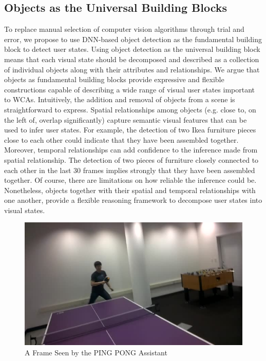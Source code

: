 \subsection{Objects as the Universal Building Blocks}

To replace manual selection of computer vision algorithms through trial and
error, we propose to use DNN-based object detection as the fundamental building
block to detect user states. Using object detection as the universal building
block means that each visual state should be decomposed and described as a
collection of individual objects along with their attributes and relationships.
We argue that objects as fundamental building blocks provide expressive and
flexible constructions capable of describing a wide range of visual user states
important to WCAs. Intuitively, the addition and removal of objects from a scene
is straightforward to express. Spatial relationships among objects (e.g. close
to, on the left of, overlap significantly) capture semantic visual features that
can be used to infer user states. For example, the detection of two Ikea
furniture pieces close to each other could indicate that they have been
assembled together. Moreover, temporal relationships can add confidence to the
inference made from spatial relationship. The detection of two pieces of
furniture closely connected to each other in the last 30 frames implies strongly
that they have been assembled together. Of course, there are limitations on how
reliable the inference could be. Nonetheless, objects together with their
spatial and temporal relationships with one another, provide a flexible
reasoning framework to decompose user states into visual states.

\begin{figure}
  \centering
  \includegraphics[trim={0 0 0 0},width=.9\linewidth]{FIGS/pingpong}
	\caption{A Frame Seen by the PING PONG Assistant}
    \label{figs:pingpong-frame}
\end{figure}

